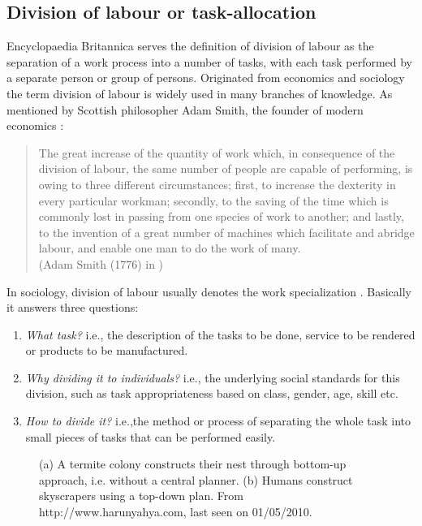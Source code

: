 \subsection{Division of labour or task-allocation}
Encyclopaedia Britannica serves the definition of division of labour as the separation of a work process into a number of tasks, with each task performed by a separate person or group of persons. Originated from economics and sociology the term division of labour is widely used in many branches of knowledge. As mentioned by Scottish philosopher Adam Smith, the founder of modern economics :
\begin{quotation} 
The great increase of the quantity of work which, in consequence of the division of labour, the same number of people are capable of performing, is owing to three different circumstances; first, to increase the dexterity in every particular workman; secondly, to the saving of the time which is commonly lost in passing from one species of work to another; and lastly, to the invention of a great number of machines which facilitate and abridge labour, and enable one man to do the work of many.\\
(Adam Smith (1776) in \cite{Sendova-Franks+1999})
\end{quotation} 
In sociology, division of labour usually denotes the work specialization \cite{Sayer+1992}. Basically it answers three questions:
\begin{enumerate}
\item {\em What task?} i.e., the description of the tasks to be done, service to be rendered or products to be manufactured.
\item  {\em Why dividing it to individuals?} i.e., the underlying social standards for this division, such as task appropriateness based on class, gender, age, skill etc.
\item {\em How to divide it?} i.e.,the method or process of separating the whole task into small pieces of tasks that can be performed easily. 
\end{enumerate}
\begin{figure}[htp]
\centering
{} 
\hspace{0.25cm}
\caption{(a) A termite colony constructs their nest through bottom-up approach, i.e. without a central planner. (b) Humans  construct skyscrapers using a top-down plan. From http://www.harunyahya.com, last seen on 01/05/2010.}
\label{fig:termite-nest}
\end{figure}
